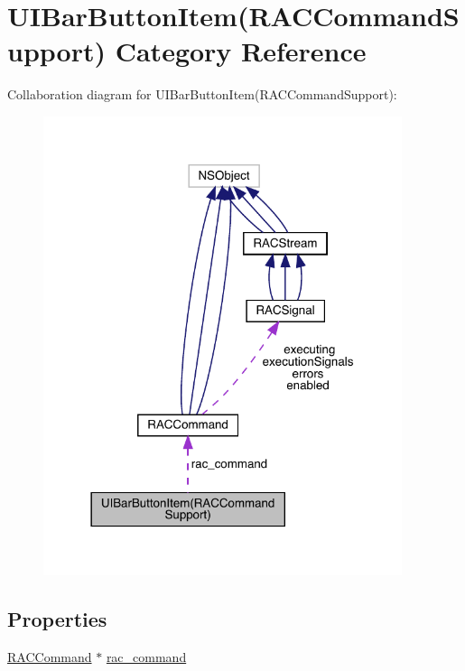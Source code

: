 \hypertarget{category_u_i_bar_button_item_07_r_a_c_command_support_08}{}\section{U\+I\+Bar\+Button\+Item(R\+A\+C\+Command\+Support) Category Reference}
\label{category_u_i_bar_button_item_07_r_a_c_command_support_08}


Collaboration diagram for U\+I\+Bar\+Button\+Item(R\+A\+C\+Command\+Support)\+:\nopagebreak
\begin{figure}[H]
\begin{center}
\leavevmode
\includegraphics[width=298pt]{category_u_i_bar_button_item_07_r_a_c_command_support_08__coll__graph}
\end{center}
\end{figure}
\subsection*{Properties}
\begin{DoxyCompactItemize}
\item 
\mbox{\hyperlink{interface_r_a_c_command}{R\+A\+C\+Command}} $\ast$ \mbox{\hyperlink{category_u_i_bar_button_item_07_r_a_c_command_support_08_a1ba2d0ff758e120019e8bdebd9241a66}{rac\+\_\+command}}
\end{DoxyCompactItemize}


